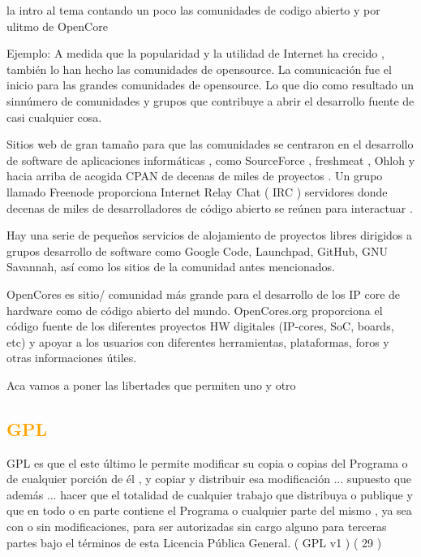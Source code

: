 \documentclass[a4paper,11pt]{article}
\begin{document}
la intro al tema contando un poco  las comunidades de codigo abierto y por ulitmo de OpenCore

Ejemplo: 
A medida que la popularidad y la utilidad de Internet ha crecido , también lo han hecho las comunidades de opensource.
La comunicación fue el inicio para las grandes comunidades de opensource. Lo que  dio como resultado un sinnúmero de comunidades y grupos que contribuye a abrir el desarrollo fuente de casi cualquier cosa.

Sitios web de gran tamaño para que las comunidades se centraron en el desarrollo de software de aplicaciones informáticas , como SourceForce , freshmeat , Ohloh y hacia arriba de acogida CPAN de decenas de miles de proyectos . Un grupo llamado Freenode proporciona Internet Relay Chat ( IRC ) servidores donde decenas de miles de desarrolladores de código abierto se reúnen para interactuar .

Hay una serie de pequeños servicios de alojamiento de proyectos libres dirigidos a grupos desarrollo de software como Google Code, Launchpad, GitHub, GNU Savannah,
así como los sitios de la comunidad antes mencionados.

OpenCores es  sitio/ comunidad más grande para el desarrollo de los  IP core de hardware como de código abierto del mundo.
OpenCores.org proporciona el código fuente de los diferentes proyectos HW digitales (IP-cores, SoC, boards, etc) y apoyar a los usuarios con diferentes herramientas, plataformas, foros y otras informaciones útiles. 

Aca vamos a poner las libertades que permiten uno y otro
		\subsection{\textcolor{orange}{GPL}}

GPL es que el
este último le permite modificar su copia o copias del Programa o de cualquier porción de él , y copiar y distribuir esa modificación ... supuesto que además ... hacer que el
totalidad de cualquier trabajo que distribuya o publique y que en todo o en
parte contiene el Programa o cualquier parte del mismo , ya sea con o sin
modificaciones, para ser autorizadas sin cargo alguno para terceras partes bajo el
términos de esta Licencia Pública General. ( GPL v1 ) ( 29 )
\end{document}
